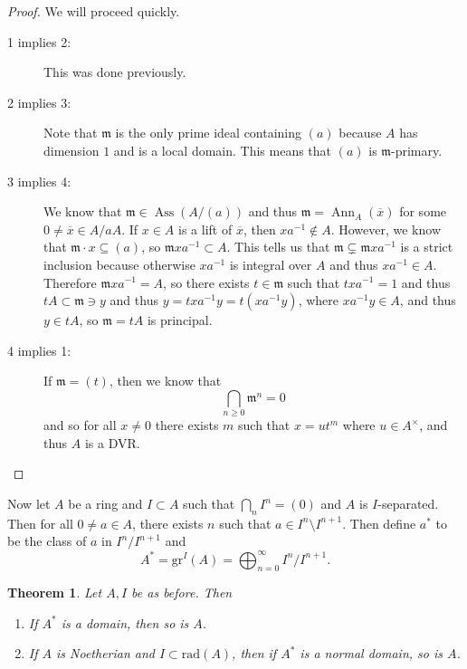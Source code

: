 \documentclass[leqno, openany]{memoir}
\newtheorem{thm}{Theorem}[section]
\theoremstyle{definition}
\theoremstyle{remark}
\theoremstyle{plain}
\theoremstyle{definition}
\theoremstyle{remark}
\newcommand{\mf}[1]{\mathfrak{#1}}
\newcommand{\mr}[1]{\mathrm{#1}}
\newcommand{\ol}[1]{\overline{#1}}
\DeclareMathOperator{\Ann}{Ann}
\DeclareMathOperator{\Ass}{Ass}
\begin{document}
\begin{proof}
    We will proceed quickly.
    \begin{description}
        \item[1 implies 2:] This was done previously.
        \item[2 implies 3:] Note that $\mf{m}$ is the only prime ideal containing $(a)$ because $A$ has dimension $1$ and is a local domain. This means that $(a)$ is $\mf{m}$-primary.
        \item[3 implies 4:] We know that $\mf{m} \in \Ass(A/(a))$ and thus $\mf{m} = \Ann_A(\ol{x})$ for some $0 \neq \ol{x} \in A/aA$. If $x \in A$ is a lift of $\ol{x}$, then $xa^{-1} \notin A$. However, we know that $\mf{m} \cdot x \subseteq (a)$, so $\mf{m}xa^{-1} \subset A$. This tells us that $\mf{m} \subsetneq \mf{m} xa^{-1}$ is a strict inclusion because otherwise $xa^{-1}$ is integral over $A$ and thus $xa^{-1} \in A$. Therefore $\mf{m} xa^{-1} = A$, so there exists $t \in \mf{m}$ such that $txa^{-1} = 1$ and thus $tA \subset \mf{m} \ni y$ and thus $y = txa^{-1}y = t(xa^{-1}y)$, where $xa^{-1}y \in A$, and thus $y \in tA$, so $\mf{m} = tA$ is principal.
        \item[4 implies 1:] If $\mf{m} = (t)$, then we know that 
            \[ \bigcap_{n \geq 0} \mf{m}^n = 0 \]
            and so for all $x \neq 0$ there exists $m$ such that $x = u t^m$ where $u \in A^{\times}$, and thus $A$ is a DVR. \qedhere
    \end{description}
\end{proof}

Now let $A$ be a ring and $I \subset A$ such that $\bigcap_n I^n = (0)$ and $A$ is $I$-separated. Then for all $0 \neq a \in A$, there exists $n$ such that $a \in I^n \setminus I^{n+1}$. Then define $a^*$ to be the class of $a$ in $I^n / I^{n+1}$ and 
\[ A^* = \mr{gr}^I(A) = \bigoplus_{n=0}^{\infty} I^n / I^{n+1}. \]

\begin{thm}
    Let $A, I$ be as before. Then
    \begin{enumerate}
        \item If $A^*$ is a domain, then so is $A$.
        \item If $A$ is Noetherian and $I \subset \mr{rad}(A)$, then if $A^*$ is a normal domain, so is $A$.
    \end{enumerate}
\end{thm}
\end{document}
